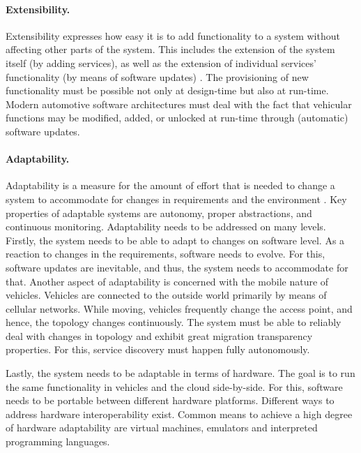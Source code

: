 \paragraph{Extensibility.} 
Extensibility expresses how easy it is to add functionality to a system without affecting other parts of the system. This includes the extension of the system itself (by adding services), as well as the extension of individual services' functionality (by means of software updates) \cite{o2007quality}. The provisioning of new functionality must be possible not only at design-time but also at run-time. Modern automotive software architectures must deal with the fact that vehicular functions may be modified, added, or unlocked at run-time through (automatic) software updates. 

\paragraph{Adaptability.}
Adaptability is a measure for the amount of effort that is needed to change a system to accommodate for changes in requirements and the environment \cite{o2007quality}. Key properties of adaptable systems are autonomy, proper abstractions, and continuous monitoring. Adaptability needs to be addressed on many levels. Firstly, the system needs to be able to adapt to changes on software level. As a reaction to changes in the requirements, software needs to evolve. For this, software updates are inevitable, and thus, the system needs to accommodate for that. Another aspect of adaptability is concerned with the mobile nature of vehicles. Vehicles are connected to the outside world primarily by means of cellular networks. While moving, vehicles frequently change the access point, and hence, the topology changes continuously. The system must be able to reliably deal with changes in topology and exhibit great migration transparency properties. For this, service discovery must happen fully autonomously. 

Lastly, the system needs to be adaptable in terms of hardware. The goal is to run the same functionality in vehicles and the cloud side-by-side. For this, software needs to be portable between different hardware platforms. Different ways to address hardware interoperability exist. Common means to achieve a high degree of hardware adaptability are virtual machines, emulators and interpreted programming languages.


